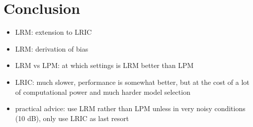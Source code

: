   \section{Conclusion}
  \label{sec:conclusion}

  \begin{itemize}
    \item LRM: extension to LRIC
    \item LRM: derivation of bias
    \item LRM vs LPM: at which settings is LRM better than LPM
    \item LRIC: much slower, performance is somewhat better, but at the cost of a lot of computational power and much harder model selection
    \item practical advice: use LRM rather than LPM unless in very noisy conditions (10 dB), only use LRIC as last resort
  \end{itemize}

